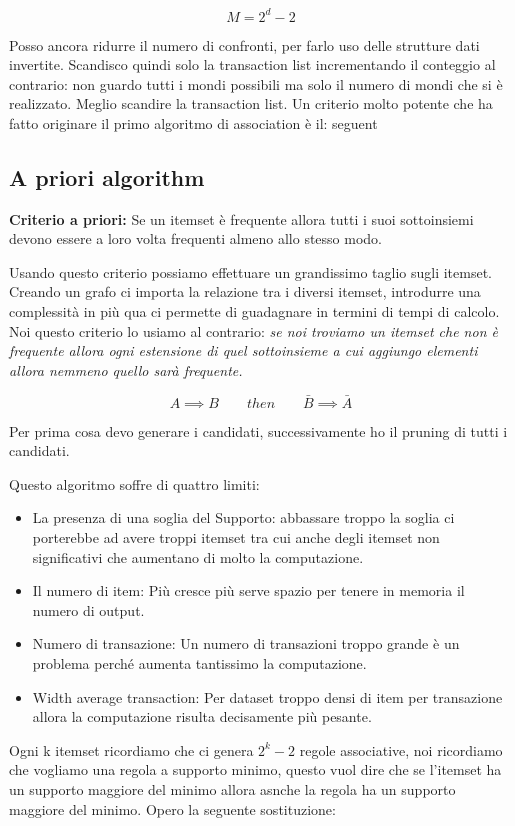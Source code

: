 \documentclass[12pt, a4paper,titlepage,openany]{article}
\begin{document}
\[ M = 2^{d} - 2\]

Posso ancora ridurre il numero di confronti, per farlo uso delle strutture dati invertite. Scandisco quindi solo la transaction list incrementando il conteggio al contrario: non guardo tutti i mondi possibili ma solo il numero di mondi che si è realizzato. Meglio scandire la transaction list. Un criterio molto potente che ha fatto originare il primo algoritmo di association è il: seguent

\subsection{A priori algorithm}
\textbf{Criterio a priori:} Se un itemset è frequente allora tutti i suoi sottoinsiemi devono essere a loro volta frequenti almeno allo stesso modo.

Usando questo criterio possiamo effettuare un grandissimo taglio sugli itemset. Creando un grafo ci importa la relazione tra i diversi itemset, introdurre una complessità in più qua ci permette di guadagnare in termini di tempi di calcolo. Noi questo criterio lo usiamo al contrario: \textit{se noi troviamo un itemset che non è frequente allora ogni estensione di quel sottoinsieme a cui aggiungo elementi allora nemmeno quello sarà frequente.}

\[ A \implies B \qquad then \qquad \bar{B} \implies \bar{A}\]

Per prima cosa devo generare i candidati, successivamente ho il pruning di tutti i candidati.

Questo algoritmo soffre di quattro limiti:
\begin{itemize}
	\item La presenza di una soglia del Supporto: abbassare troppo la soglia ci porterebbe ad avere troppi itemset tra cui anche degli itemset non significativi che aumentano di molto la computazione.
	\item Il numero di item: Più cresce più serve spazio per tenere in memoria il numero di output.
	\item Numero di transazione: Un numero di transazioni troppo grande è un problema perché aumenta tantissimo la computazione.
	\item Width average transaction: Per dataset troppo densi di item per transazione allora la computazione risulta decisamente più pesante.
\end{itemize}

Ogni k itemset ricordiamo che ci genera $2^{k} - 2 $ regole associative, noi ricordiamo che vogliamo una regola a supporto minimo, questo vuol dire che se l'itemset ha un supporto maggiore del minimo allora asnche la regola ha un supporto maggiore del minimo.
Opero la seguente sostituzione:
\end{document}
